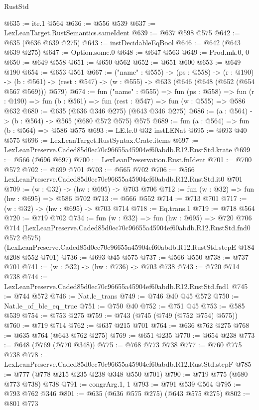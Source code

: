 \begin{lexlean}{RustStd}
\begin{coremodule}
@635 := ite.{1} @564
@636 := @556 @539
@637 := LexLeanTarget.RustSemantics.sameIdent
@639 := @637 @598 @575
@642 := @635 (@636 @639 @275)
@643 := instDecidableEqBool
@646 := @642 (@643 @639 @275)
@647 := Option.some.{0}
@648 := @647 @563
@649 := Prod.mk.{0, 0}
@650 := @649 @558
@651 := @650 @562
@652 := @651 @600
@653 := @649 @190
@654 := @653 @561
@667 := ("name" : @555) ->
  (ps : @558) ->
  (r : @190) ->
  (b : @561) -> (rest : @547) -> (w : @555) -> @633 (@646 (@648 (@652 (@654 @567 @569))) @579)
@674 := fun ("name" : @555) =>
  fun (ps : @558) =>
  fun (r : @190) => fun (b : @561) => fun (rest : @547) => fun (w : @555) => @586 @632
@680 := @635 (@636 @346 @275) (@643 @346 @275)
@686 := (a : @564) -> (b : @564) -> @565 (@680 @572 @575) @575
@689 := fun (a : @564) => fun (b : @564) => @586 @575
@693 := LE.le.{0} @32 instLENat
@695 := @693 @40 @575
@696 := LexLeanTarget.RustSyntax.Crate.items
@697 := LexLeanPreserve.Caded85d0ec70c96655a45904ef60abdb.R12.RustStd.krate
@699 := @566 (@696 @697)
@700 := LexLeanPreservation.Rust.fnIdent
@701 := @700 @572
@702 := @699 @701
@703 := @565 @702
@706 := @566 LexLeanPreserve.Caded85d0ec70c96655a45904ef60abdb.R12.RustStd.it0 @701
@709 := (w : @32) -> (hw : @695) -> @703 @706
@712 := fun (w : @32) => fun (hw : @695) => @586 @702
@713 := @566 @552
@714 := @713 @701
@717 := (w : @32) -> (hw : @695) -> @703 @714
@718 := Eq.trans.{1}
@719 := @718 @564
@720 := @719 @702
@734 := fun (w : @32) =>
  fun (hw : @695) =>
  @720
    @706
    @714
    (LexLeanPreserve.Caded85d0ec70c96655a45904ef60abdb.R12.RustStd.fnd0 @572 @575)
    (LexLeanPreserve.Caded85d0ec70c96655a45904ef60abdb.R12.RustStd.stepE @184 @208 @552 @701)
@736 := @693 @45 @575
@737 := @566 @550
@738 := @737 @701
@741 := (w : @32) -> (hw : @736) -> @703 @738
@743 := @720 @714 @738
@744 := LexLeanPreserve.Caded85d0ec70c96655a45904ef60abdb.R12.RustStd.fnd1
@745 := @744 @572
@746 := Nat.le_trans
@749 := @746 @40 @45 @572
@750 := Nat.le_of_ble_eq_true
@751 := @750 @40
@752 := @751 @45
@753 := @585 @539
@754 := @753 @275
@759 := @743 (@745 (@749 (@752 @754) @575))
@760 := @719 @714
@762 := @637 @215 @701
@764 := @636 @762 @275
@768 := @635 @764 (@643 @762 @275)
@769 := @651 @235
@770 := @654 @238
@773 := @648 (@769 (@770 @348))
@775 := @768 @773 @738
@777 := @760 @775 @738
@778 := LexLeanPreserve.Caded85d0ec70c96655a45904ef60abdb.R12.RustStd.stepF
@785 := @777 (@778 @215 @235 @238 @348 @550 @701)
@790 := @719 @775 (@680 @773 @738) @738
@791 := congrArg.{1, 1}
@793 := @791 @539 @564
@795 := @793 @762 @346
@801 := @635 (@636 @575 @275) (@643 @575 @275)
@802 := @801 @773

\end{coremodule}
\end{lexlean}
